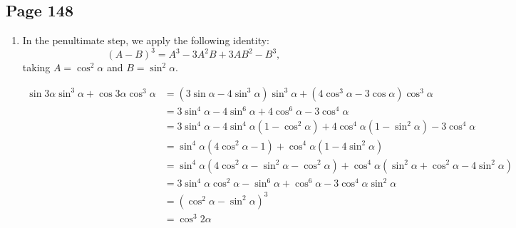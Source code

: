 \documentclass{article}
\newenvironment{solutions}[1]
{\subsection*{#1}
 \begin{enumerate}[leftmargin=1.5em]}
{\end{enumerate}}
\newcommand{\solution}{\item}
\begin{document}
\begin{solutions}{Page 148}
\solution %
In the penultimate step, we apply the following identity:
\[
\left(A-B\right)^{3} = A^3 - 3A^{2}B + 3AB^{2} - B^3,
\]
taking $A=\cos^{2}{\alpha}$ and $B=\sin^{2}{\alpha}$.

\begin{align*}
\sin{3\alpha}\sin^{3}{\alpha} + \cos{3\alpha}\cos^{3}{\alpha} &= \left(3\sin{\alpha}-4\sin^{3}{\alpha}\right)\sin^{3}{\alpha} + \left(4\cos^{3}{\alpha}-3\cos{\alpha}\right)\cos^{3}{\alpha} \\
&= 3\sin^{4}{\alpha}-4\sin^{6}{\alpha}+4\cos^{6}{\alpha}-3\cos^{4}{\alpha} \\
&=3\sin^{4}{\alpha}-4\sin^{4}{\alpha}\left(1-\cos^{2}{\alpha}\right)+4\cos^{4}{\alpha}\left(1-\sin^{2}{\alpha}\right)-3\cos^{4}{\alpha} \\
&= \sin^{4}{\alpha}\left(4\cos^{2}{\alpha}-1\right) + \cos^{4}{\alpha}\left(1-4\sin^{2}{\alpha}\right) \\
&= \sin^{4}{\alpha}\left(4\cos^{2}{\alpha}-\sin^{2}{\alpha}-\cos^{2}{\alpha}\right) + \cos^{4}{\alpha}\left(\sin^{2}{\alpha}+\cos^{2}{\alpha}-4\sin^{2}{\alpha}\right) \\
&=3\sin^{4}{\alpha}\cos^{2}{\alpha}-\sin^{6}{\alpha}+\cos^{6}{\alpha}-3\cos^{4}{\alpha}\sin^{2}{\alpha} \\
&= \left(\cos^{2}{\alpha}-\sin^{2}{\alpha}\right)^3 \\
&= \cos^{3}{2\alpha}
\end{align*}
\end{solutions}
\end{document}
